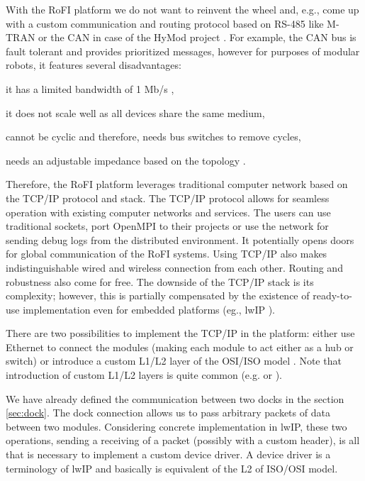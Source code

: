 With the RoFI platform we do not want to reinvent the wheel and, e.g., come up
with a custom communication and routing protocol based on RS-485 like M-TRAN or
the CAN in case of the HyMod project \cite{parrott_hymod:_2016}. For example,
the CAN bus is fault tolerant and provides prioritized messages, however for
purposes of modular robots, it features several disadvantages:
\begin{enumerate*}
    \item it has a limited bandwidth of 1 Mb/s \cite{noauthor_road_2013},
    \item it does not scale well as all devices share the same medium,
    \item cannot be cyclic and therefore, needs bus switches to remove cycles,
    \item needs an adjustable impedance based on the topology
    \cite{parrott_hymod:_2016}.
\end{enumerate*}

Therefore, the RoFI platform leverages traditional computer network based on the
TCP/IP protocol and stack. The TCP/IP protocol allows for seamless operation
with existing computer networks and services. The users can use traditional
sockets, port OpenMPI to their projects or use the network for sending debug
logs from the distributed environment. It potentially opens doors for global
communication of the RoFI systems. Using TCP/IP also makes indistinguishable
wired and wireless connection from each other. Routing and robustness also come
for free. The downside of the TCP/IP stack is its complexity; however, this is
partially compensated by the existence of ready-to-use implementation even for
embedded platforms (eg., lwIP \cite{noauthor_lwip_nodate}).

There are two possibilities to implement the TCP/IP in the platform: either use
Ethernet to connect the modules (making each module to act either as a hub or
switch) or introduce a custom L1/L2 layer of the OSI/ISO model
\cite{braden_requirements_1989}. Note that introduction of custom L1/L2 layers
is quite common (e.g. \cite{lindgren_ip_2008} or \cite{waitzman_ip_1999}).

We have already defined the communication between two docks in the section
\ref{sec:dock}. The dock connection allows us to pass arbitrary packets of data
between two modules. Considering concrete implementation in lwIP, these two
operations, sending a receiving of a packet (possibly with a custom header), is
all that is necessary to implement a custom device driver. A device driver is a
terminology of lwIP and basically is equivalent of the L2 of ISO/OSI model.

